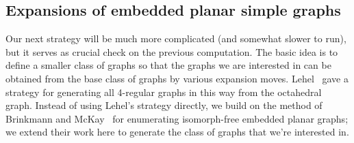 \documentclass[amsmath,secnumarabic,floatfix,amssymb,nofootinbib,nobibnotes,letterpaper,11pt,tightenlines,showkeys]{revtex4}
\theoremstyle{definition}
\begin{document}
\subsection{Expansions of embedded planar simple graphs}

Our next strategy will be much more complicated (and somewhat slower to run), but it serves as crucial check on the previous computation. The basic idea is to define a smaller class of graphs so that the graphs we are interested in can be obtained from the base class of graphs by various expansion moves. Lehel~\cite{JGT:JGT3190050412} gave a strategy for generating all 4-regular graphs in this way from the octahedral graph. Instead of using Lehel's strategy directly, we build on the method of Brinkmann and McKay~\cite{Brinkmann:2007up,McKay:1998wa} for enumerating isomorph-free embedded planar graphs; we extend their work here to generate the class of graphs that we're interested in.
\end{document}
